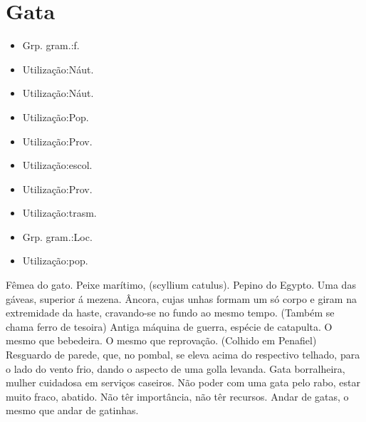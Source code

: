 \section{Gata}
\begin{itemize}
\item {Grp. gram.:f.}
\end{itemize}
\begin{itemize}
\item {Utilização:Náut.}
\end{itemize}
\begin{itemize}
\item {Utilização:Náut.}
\end{itemize}
\begin{itemize}
\item {Utilização:Pop.}
\end{itemize}
\begin{itemize}
\item {Utilização:Prov.}
\end{itemize}
\begin{itemize}
\item {Utilização:escol.}
\end{itemize}
\begin{itemize}
\item {Utilização:Prov.}
\end{itemize}
\begin{itemize}
\item {Utilização:trasm.}
\end{itemize}
\begin{itemize}
\item {Grp. gram.:Loc.}
\end{itemize}
\begin{itemize}
\item {Utilização:pop.}
\end{itemize}
Fêmea do gato.
Peixe marítimo, (\textunderscore scyllium catulus\textunderscore ).
Pepino do Egypto.
Uma das gáveas, superior á mezena.
Âncora, cujas unhas formam um só corpo e giram na extremidade da haste, cravando-se no fundo ao mesmo tempo. (Também se chama \textunderscore ferro de tesoira\textunderscore )
Antiga máquina de guerra, espécie de catapulta.
O mesmo que \textunderscore bebedeira\textunderscore .
O mesmo que \textunderscore reprovação\textunderscore . (Colhido em Penafiel)
Resguardo de parede, que, no pombal, se eleva acima do respectivo telhado, para o lado do vento frio, dando o aspecto de uma golla levanda.
\textunderscore Gata borralheira\textunderscore , mulher cuidadosa em serviços caseiros.
\textunderscore Não poder com uma gata pelo rabo\textunderscore , estar muito fraco, abatido.
Não têr importância, não têr recursos.
\textunderscore Andar de gatas\textunderscore , o mesmo que \textunderscore andar de gatinhas\textunderscore .
